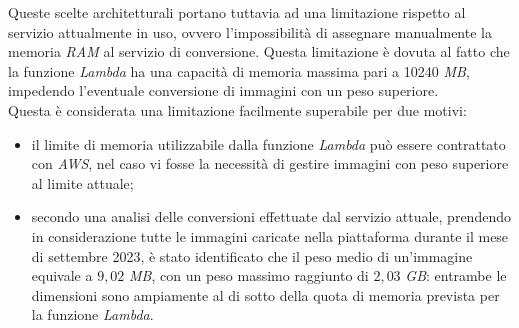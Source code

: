 Queste scelte architetturali portano tuttavia ad una limitazione rispetto al servizio
attualmente in uso, ovvero l'impossibilità di assegnare manualmente la memoria
\emph{RAM} al servizio di conversione. Questa limitazione è dovuta al fatto che
la funzione \emph{Lambda} ha una capacità di memoria massima pari a 10240
\emph{MB}, impedendo l'eventuale conversione di immagini con un peso
superiore.\\
Questa è considerata una limitazione facilmente superabile per due motivi:
\begin{itemize}
      \item il limite di memoria utilizzabile dalla funzione \emph{Lambda} può essere
            contrattato con \emph{AWS}, nel caso vi fosse la necessità di gestire immagini
            con peso superiore al limite attuale;
      \item secondo una analisi delle conversioni effettuate dal servizio attuale,
            prendendo in considerazione tutte le immagini caricate nella piattaforma
            durante il mese di settembre 2023, è stato identificato che il peso medio di
            un'immagine equivale a $9,02$ \emph{MB}, con un peso massimo raggiunto di $2,03$
            \emph{GB}: entrambe le dimensioni sono ampiamente al di sotto della quota di
            memoria prevista per la funzione \emph{Lambda}.
\end{itemize}



